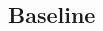 \documentclass{article}
\begin{document}
\begin{spacing}{0.9}
\subsection{Baseline}
\vspace{-2mm}





\end{spacing}
\end{document}
